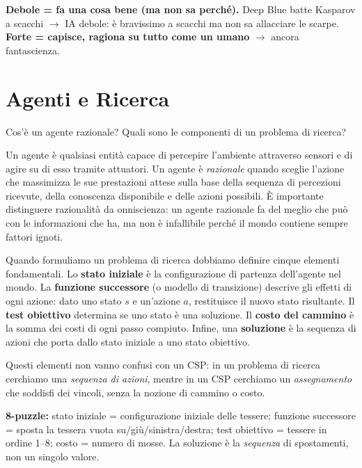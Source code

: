 \documentclass[12pt,a4paper]{article}
\begin{document}
\begin{ricordabox}
\textbf{Debole = fa una cosa bene (ma non sa perché).} Deep Blue batte Kasparov a scacchi $\to$ IA debole: è bravissimo a scacchi ma non sa allacciare le scarpe. \textbf{Forte = capisce, ragiona su tutto come un umano} $\to$ ancora fantascienza.
\end{ricordabox}

\section{Agenti e Ricerca}

\begin{domandabox}{Cos'è un agente razionale? Quali sono le componenti di un problema di ricerca?}
\end{domandabox}

Un agente è qualsiasi entità capace di percepire l'ambiente attraverso sensori e di agire su di esso tramite attuatori. Un agente è \emph{razionale} quando sceglie l'azione che massimizza le sue prestazioni attese sulla base della sequenza di percezioni ricevute, della conoscenza disponibile e delle azioni possibili. È importante distinguere razionalità da onniscienza: un agente razionale fa del meglio che può con le informazioni che ha, ma non è infallibile perché il mondo contiene sempre fattori ignoti.

Quando formuliamo un problema di ricerca dobbiamo definire cinque elementi fondamentali. Lo \textbf{stato iniziale} è la configurazione di partenza dell'agente nel mondo. La \textbf{funzione successore} (o modello di transizione) descrive gli effetti di ogni azione: dato uno stato $s$ e un'azione $a$, restituisce il nuovo stato risultante. Il \textbf{test obiettivo} determina se uno stato è una soluzione. Il \textbf{costo del cammino} è la somma dei costi di ogni passo compiuto. Infine, una \textbf{soluzione} è la sequenza di azioni che porta dallo stato iniziale a uno stato obiettivo.

Questi elementi non vanno confusi con un CSP: in un problema di ricerca cerchiamo una \emph{sequenza di azioni}, mentre in un CSP cerchiamo un \emph{assegnamento} che soddisfi dei vincoli, senza la nozione di cammino o costo.

\begin{esempiobox}
\textbf{8-puzzle:} stato iniziale = configurazione iniziale delle tessere; funzione successore = sposta la tessera vuota su/giù/sinistra/destra; test obiettivo = tessere in ordine 1--8; costo = numero di mosse. La soluzione è la \emph{sequenza} di spostamenti, non un singolo valore.
\end{esempiobox}
\end{document}
